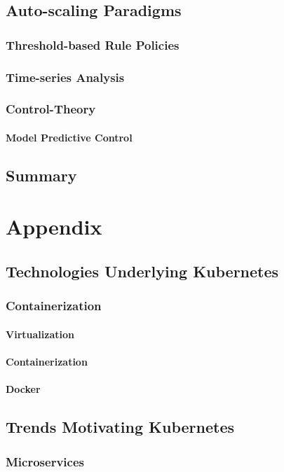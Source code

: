 \documentclass[twoside]{report}
\begin{document}
\section{Auto-scaling Paradigms}

\subsection{Threshold-based Rule Policies}

\subsection{Time-series Analysis}

\subsection{Control-Theory}

\subsubsection{Model Predictive Control}

\section{Summary}

\chapter{Appendix}

\section{Technologies Underlying Kubernetes}

\subsection{Containerization}

\subsubsection{Virtualization}

\subsubsection{Containerization}

\subsubsection{Docker}

\section{Trends Motivating Kubernetes}

\subsection{Microservices}



\end{document}
